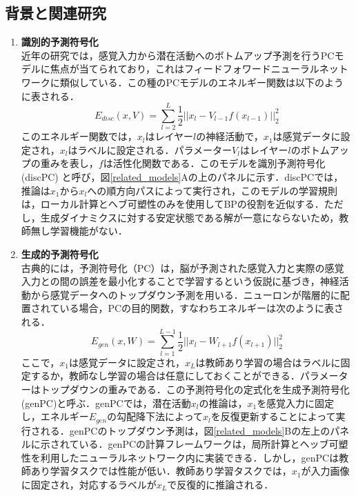 \documentclass[a4paper, titlepage]{jsarticle}
\begin{document}
\subsection{背景と関連研究}
\begin{enumerate}
   \item \textbf{識別的予測符号化} \\
   近年の研究では，感覚入力から潜在活動へのボトムアップ予測を行うPCモデルに焦点が当てられており，これはフィードフォワードニューラルネットワークに類似している．この種のPCモデルのエネルギー関数は以下のように表される．
   \begin{equation}
      E_{disc}(x,V)=\sum_{l=2}^L\frac{1}{2}||x_l-V_{l-1}f(x_{l-1})||_2^2
   \end{equation}
   このエネルギー関数では，$x_l$はレイヤー$l$の神経活動で，$x_1$は感覚データに設定され，$x_l$はラベルに設定される．パラメーター$V_l$はレイヤー$l$のボトムアップの重みを表し，$f$は活性化関数である．このモデルを識別予測符号化 (discPC) と呼び，図\ref{related_models}Aの上のパネルに示す．discPCでは，推論は$x_1$から$x_l$への順方向パスによって実行され，このモデルの学習規則は，ローカル計算とヘブ可塑性のみを使用してBPの役割を近似する．ただし，生成ダイナミクスに対する安定状態である解が一意にならないため，教師無し学習機能がない．
   \\
   \item \textbf{生成的予測符号化} \\
   古典的には，予測符号化（PC）は，脳が予測された感覚入力と実際の感覚入力との間の誤差を最小化することで学習するという仮説に基づき，神経活動から感覚データへのトップダウン予測を用いる．ニューロンが階層的に配置されている場合，PCの目的関数，すなわちエネルギーは次のように表される．
   \begin{equation}
      E_{gen}(x,W)=\sum_{l=1}^{L-1}\frac{1}{2}||x_l-W_{l+1}f(x_{l+1})||_2^2
   \end{equation}
   ここで，$x_1$は感覚データに設定され，$x_L$は教師あり学習の場合はラベルに固定するか，教師なし学習の場合は任意にしておくことができる．パラメーターはトップダウンの重みである．この予測符号化の定式化を生成予測符号化(genPC)と呼ぶ．genPCでは，潜在活動$x_l$の推論は，$x_1$を感覚入力に固定し，エネルギー$E_{gen}$の勾配降下法によって$x_l$を反復更新することによって実行される．genPCのトップダウン予測は，図\ref{related_models}Bの左上のパネルに示されている．genPCの計算フレームワークは，局所計算とヘッブ可塑性を利用したニューラルネットワーク内に実装できる．しかし，genPCは教師あり学習タスクでは性能が低い．教師あり学習タスクでは，$x_1$が入力画像に固定され，対応するラベルが$x_L$で反復的に推論される．

\end{enumerate}
\end{document}
